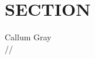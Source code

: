 \documentclass[aps,prb,superscriptaddress,showpacs,
               preprint,amsmath,11pt]{revtex4}
\begin{document}
\section{SECTION}

{\centering
  Callum Gray \\
}
{\centering
  \number\day{}/\number\month{}/\number\year{} \\ \vspace{0.5cm}
}


\end{document}
